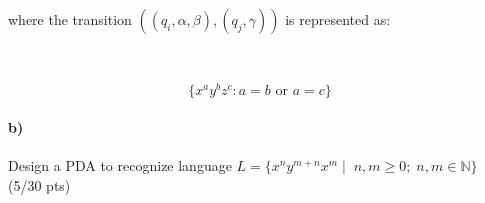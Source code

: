 \documentclass[a4paper,12pt]{article}
\begin{document}
\begin{minipage}{0.60\textwidth}
where the transition $((q_i,\alpha,\beta),(q_j,\gamma)) $ is represented as: 
\end{minipage}
\begin{minipage}{0.30\textwidth}
 \\
\end{minipage}


\begin{tcolorbox}
\[
\{x^ay^bz^c : a=b\text{ or } a = c \}
\]
\end{tcolorbox}


\paragraph{b)} 
Design a PDA to recognize language $ L=\{x^n y^{m+n} x^m \mid \; n,m \geq 0; \; n,m \in \mathbb{N}  \} $  \hfill \small{(5/30 pts)} \\
\end{document}
